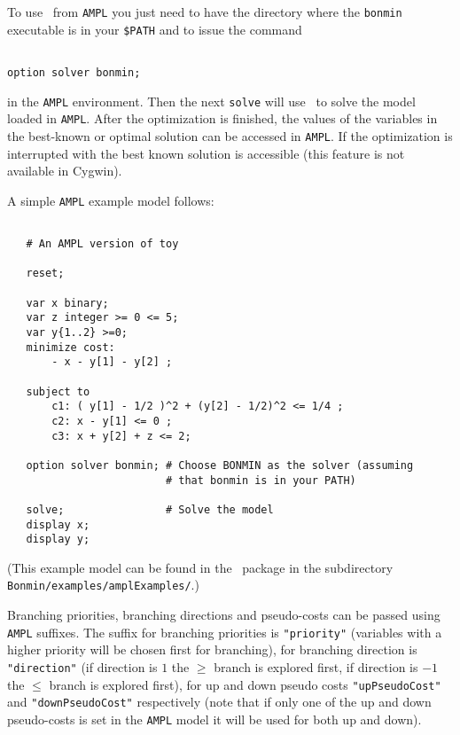 To use \Bonmin\ from {\tt AMPL} you just need to have the directory where the
{\tt bonmin} executable is in your {\tt \$PATH} and to issue the
command

\begin{colorverb}
\begin{verbatim}

option solver bonmin;

\end{verbatim}
\end{colorverb}

in the {\tt AMPL} environment. Then the next {\tt solve} will
use \Bonmin\ to solve the model loaded in {\tt AMPL}.
After the optimization is finished, the values of the variables in the best-known
or optimal solution can be accessed in {\tt AMPL}. If the optimization is interrupted
with {\tt <CTRL-C>} the best known solution is accessible (this feature is not available in Cygwin).

A simple {\tt AMPL} example model follows:

\begin{colorverb}
\begin{verbatim}

   # An AMPL version of toy

   reset;

   var x binary;
   var z integer >= 0 <= 5;
   var y{1..2} >=0;
   minimize cost:
       - x - y[1] - y[2] ;

   subject to
       c1: ( y[1] - 1/2 )^2 + (y[2] - 1/2)^2 <= 1/4 ;
       c2: x - y[1] <= 0 ;
       c3: x + y[2] + z <= 2;

   option solver bonmin; # Choose BONMIN as the solver (assuming
                         # that bonmin is in your PATH)

   solve;                # Solve the model
   display x;
   display y;

\end{verbatim}
\end{colorverb}
(This example model can be found in the \Bonmin\ package in the subdirectory {\tt Bonmin/examples/amplExamples/}.)

Branching priorities, branching directions and pseudo-costs can be passed using {\tt AMPL} suffixes.
The suffix for branching priorities is {\tt "priority"} (variables with a higher priority
will be chosen first for branching),
for branching direction is {\tt "direction"} (if direction is $1$ the $\geq$ branch
is explored first, if direction is $-1$ the $\leq$ branch is explored first), for up
and down pseudo costs {\tt "upPseudoCost"} and {\tt "downPseudoCost"} respectively
(note that if only one of the up and down pseudo-costs is set in the {\tt AMPL} model it will
be used for both up and down).

